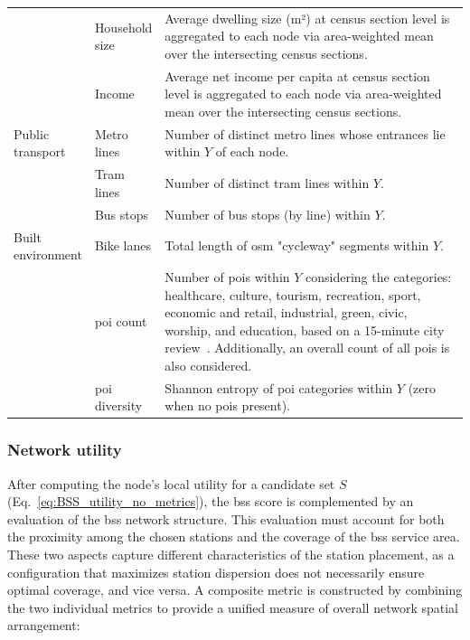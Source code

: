 \begin{table}[!htbp]
\begin{tabular}{p{0.15\linewidth} p{0.12\linewidth} p{0.73\linewidth}}
                & Household size 
                    & Average dwelling size (m²) at census section level is aggregated to each node via area-weighted mean over the intersecting census sections. \\
                & Income 
                    & Average net income per capita at census section level is aggregated to each node via area-weighted mean over the intersecting census sections. \\
                \midrule
                
                Public transport  & Metro lines 
                    & Number of distinct metro lines whose entrances lie within \(Y\) of each node. \\
                & Tram lines 
                    & Number of distinct tram lines within \(Y\). \\
                & Bus stops 
                    & Number of bus stops (by line) within \(Y\). \\
                \midrule
                
                Built environment & Bike lanes 
                    & Total length of \ac{osm} "cycleway" segments within \(Y\). \\
                & \ac{poi} count 
                    & Number of \acp{poi} within \(Y\) considering the categories: healthcare, culture, tourism, recreation, sport, economic and retail, industrial, green, civic, worship, and education, based on a 15-minute city review~\cite{Papadopoulos2023}. Additionally, an overall count of all \acp{poi} is also considered.\\
                & \ac{poi} diversity 
                    & Shannon entropy of \ac{poi} categories within \(Y\) (zero when no \acp{poi} present). \\
                \bottomrule
            \end{tabular}
        \end{table}


        \subsubsection{Network utility} \label{sec:section_network_utility}

        After computing the node's local utility for a candidate set $S$ (Eq.~\ref{eq:BSS_utility_no_metrics}), the \ac{bss} score is complemented by an evaluation of the \ac{bss} network structure. This evaluation must account for both the proximity among the chosen stations and the coverage of the \ac{bss} service area. These two aspects capture different characteristics of the station placement, as a configuration that maximizes station dispersion does not necessarily ensure optimal coverage, and vice versa. A composite metric is constructed by combining the two individual metrics to provide a unified measure of overall network spatial arrangement:

